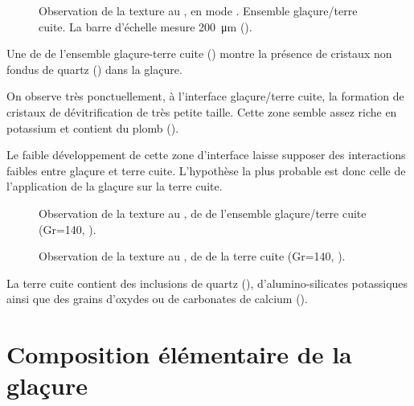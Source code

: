 \begin{figure}[htb]
  \caption[\ -- Observation de la texture au \MEB, 
           en mode \ERD. Ensemble glaçure/terre cuite]
          {\legendeD 
           Observation de la texture au \MEB, en mode \ERD. 
           Ensemble glaçure/terre cuite. La barre d'échelle mesure 
           \SI{200}{\um} ().}
  \label{MEB:6531_img}
\end{figure}

Une \carto de \RX de l'ensemble glaçure-terre cuite () montre la présence de cristaux non fondus de quartz () dans la glaçure.

On observe très ponctuellement, à l'interface glaçure/terre cuite, la 
formation de cristaux de dévitrification de très petite taille. Cette 
zone semble assez riche en potassium et contient du plomb 
().

Le faible développement de cette zone d'interface laisse supposer des 
interactions faibles entre glaçure et terre cuite. L'hypothèse la plus 
probable est donc celle de l'application de la glaçure sur la terre 
cuite.

\begin{figure}[htb]
  \caption[\ -- Observation de la texture au \MEB, \carto de \RX de l'ensemble glaçure/terre cuite]
          {\legendeD 
           Observation de la texture au \MEB, \carto de \RX de l'ensemble glaçure/terre cuite (Gr=140, ).}
  \label{MEB:6531_carto_tcgla}
\end{figure}

\begin{figure}[htb]
  \caption[\ -- Observation de la texture au \MEB, \carto de \RX de la terre cuite]
          {\legendeD 
           Observation de la texture au \MEB, \carto de \RX de la terre cuite (Gr=140, ).}
  \label{MEB:6531_carto_tc}
\end{figure}

La terre cuite contient des inclusions de quartz (), 
d'alumino-silicates potassiques ainsi que des grains d'oxydes ou de 
carbonates de calcium ().


\section{Composition élémentaire de la glaçure}

